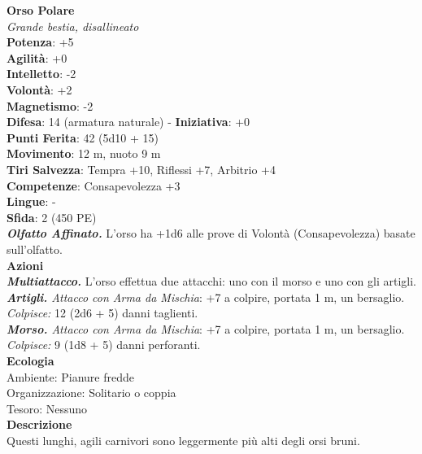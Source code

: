 \begin{multicols}{2}
\medskip\textbf{Orso Polare}\\
\emph{Grande bestia, disallineato}\\
\textbf{Potenza}: +5\\
\textbf{Agilità}: +0\\
\textbf{Intelletto}: -2\\
\textbf{Volontà}: +2\\
\textbf{Magnetismo}: -2\\
\textbf{Difesa}: 14 (armatura naturale) - \textbf{Iniziativa}: +0\\
\textbf{Punti Ferita}: 42 (5d10 + 15)\\
\textbf{Movimento}: 12 m, nuoto 9 m\\
\textbf{Tiri Salvezza}: Tempra +10, Riflessi +7, Arbitrio +4 \\
\textbf{Competenze}: Consapevolezza +3\\
\textbf{Lingue}: -\\
\textbf{Sfida}: 2 (450 PE)\smallskip\\
\emph{\textbf{Olfatto Affinato.}} L'orso ha +1d6 alle prove di Volontà (Consapevolezza) basate sull'olfatto.\\
\smallskip\textbf{Azioni}\\
\emph{\textbf{Multiattacco.}} L'orso effettua due attacchi: uno con il morso e uno con gli artigli.\\
\emph{\textbf{Artigli.} Attacco con Arma da Mischia}: +7 a colpire, portata 1 m, un bersaglio.\\
\emph{Colpisce:} 12 (2d6 + 5) danni taglienti.\\
\emph{\textbf{Morso.} Attacco con Arma da Mischia}: +7 a colpire, portata 1 m, un bersaglio.\\
\emph{Colpisce:} 9 (1d8 + 5) danni perforanti.\\
\textbf{Ecologia}\\
Ambiente: Pianure fredde\\
Organizzazione: Solitario o coppia\\
Tesoro: Nessuno\\
\textbf{Descrizione}\\

Questi lunghi, agili carnivori sono leggermente più alti degli orsi bruni. \\


\end{multicols}
